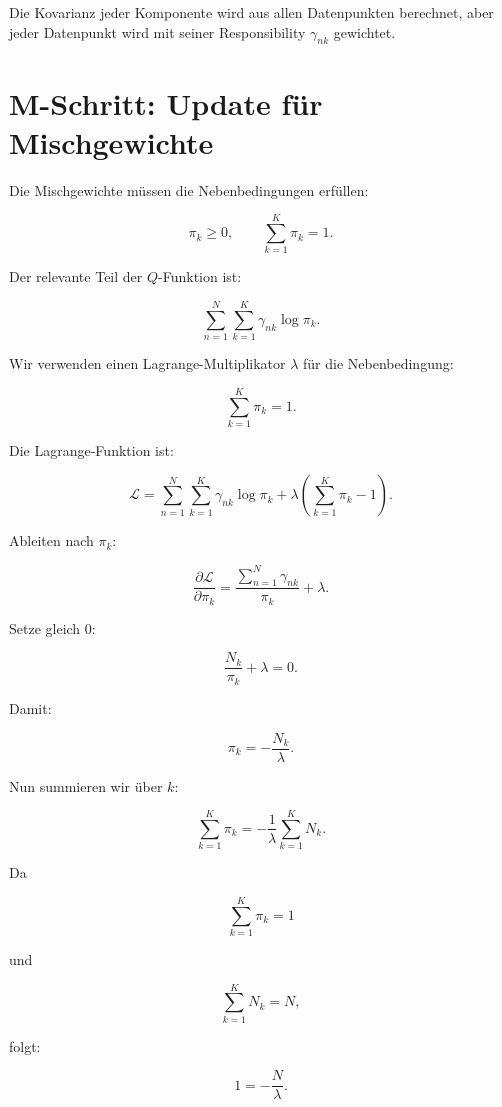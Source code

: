 \begin{conceptbox}
Die Kovarianz jeder Komponente wird aus allen Datenpunkten berechnet, aber jeder Datenpunkt wird mit seiner Responsibility \(\gamma_{nk}\) gewichtet.
\end{conceptbox}

\section{M-Schritt: Update für Mischgewichte}

Die Mischgewichte müssen die Nebenbedingungen erfüllen:

\[
    \pi_k\geq 0,
    \qquad
    \sum_{k=1}^{K}
    \pi_k=1.
\]

Der relevante Teil der \(Q\)-Funktion ist:

\[
    \sum_{n=1}^{N}
    \sum_{k=1}^{K}
    \gamma_{nk}
    \log \pi_k.
\]

Wir verwenden einen Lagrange-Multiplikator \(\lambda\) für die Nebenbedingung:

\[
    \sum_{k=1}^{K}\pi_k=1.
\]

Die Lagrange-Funktion ist:

\[
    \mathcal{L}
    =
    \sum_{n=1}^{N}
    \sum_{k=1}^{K}
    \gamma_{nk}
    \log \pi_k
    +
    \lambda
    \left(
        \sum_{k=1}^{K}
        \pi_k
        -
        1
    \right).
\]

Ableiten nach \(\pi_k\):

\[
    \frac{\partial\mathcal{L}}{\partial\pi_k}
    =
    \frac{
        \sum_{n=1}^{N}
        \gamma_{nk}
    }{
        \pi_k
    }
    +
    \lambda.
\]

Setze gleich \(0\):

\[
    \frac{N_k}{\pi_k}
    +
    \lambda
    =
    0.
\]

Damit:

\[
    \pi_k
    =
    -\frac{N_k}{\lambda}.
\]

Nun summieren wir über \(k\):

\[
    \sum_{k=1}^{K}
    \pi_k
    =
    -\frac{1}{\lambda}
    \sum_{k=1}^{K}
    N_k.
\]

Da

\[
    \sum_{k=1}^{K}\pi_k=1
\]

und

\[
    \sum_{k=1}^{K}N_k
    =
    N,
\]

folgt:

\[
    1
    =
    -\frac{N}{\lambda}.
\]

